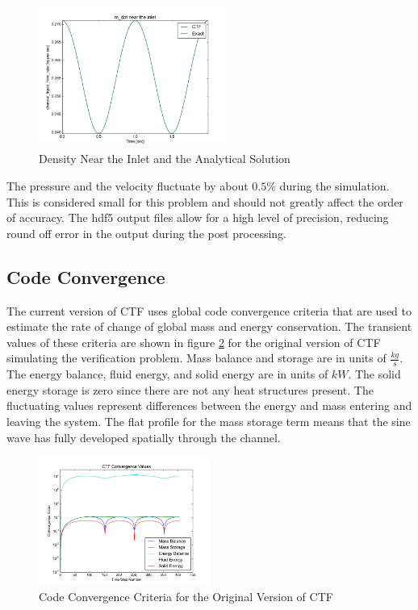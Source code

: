 \documentclass{mc2015}
\begin{document}
\begin{figure}[!h]
	\centering
	\includegraphics[width=0.55\textwidth]{images/Code_Verification/run_00_00/residual/results/Inlet_m_dot}
	\caption{Density Near the Inlet and the Analytical Solution}
	\label{fig:Inlet_m_dot}
\end{figure}

 The pressure and the velocity fluctuate by about $0.5\%$ during the simulation.
 This is considered small for this problem and should
 not greatly affect the order of accuracy.  The
 hdf5 output files allow for a high level of precision, reducing
 round off error in the output during the post processing.

\subsection{Code Convergence}

The current version of CTF uses global code convergence criteria that are
used to estimate the rate of change of global mass and energy conservation. The
transient values of these criteria are shown in figure \ref{fig:Code_Convergence:Original} for the original version of
CTF simulating the verification problem. Mass balance and storage are in units
of $\frac{kg}{s}$. The energy balance, fluid energy, and solid energy are in units of $kW$.
The solid energy storage is zero since there are not any heat structures present. The fluctuating values
represent differences between the energy and mass entering and leaving the
system. The flat profile for the mass storage term means that the sine wave has
fully developed spatially through the channel. 

\begin{figure}[!h]
	\centering
	\includegraphics[width=0.50\textwidth]{images/Code_Verification/run_00_00/original/results/Convergence_Plot}
	\caption{Code Convergence Criteria for the Original Version of CTF}
	\label{fig:Code_Convergence:Original}
\end{figure}
\end{document}
